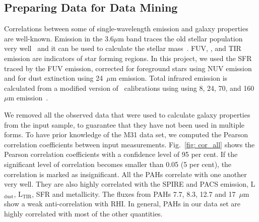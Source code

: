      \subsection{Preparing Data for Data Mining}
    
     Correlations between some of single-wavelength emission and galaxy properties are well-known.
     Emission in the 3.6$\mu$m band traces the old stellar population very well~\citep[e.g.][]{Smith07a,Leitherer99} and it can be used to calculate the stellar mass~\citep{Eskew12}.
     FUV, \halpha, and TIR emission are indicators of star forming regions.
     In this project, we used the SFR traced by the FUV emission, corrected for foreground stars using NUV emission and for dust extinction using 24~$\mu$m emission.
     Total infrared emission is calculated from a modified version of~\cite{Draine07} calibrations using using 8, 24, 70, and 160~$\mu$m emission~\citep{Boquien10}.
    
    
    We removed all the observed data that were used to calculate galaxy properties from the input sample, to guarantee that they have not been used in multiple forms.
    To have prior knowledge of the M31 data set, 
    we computed the Pearson correlation coefficients between input measurements.
    Fig.~\ref{fig: cor_all} shows the Pearson correlation coefficients with a confidence level of 95 per cent. 
    If the significant level of correlation becomes smaller than 0.05 (5 per cent), the correlation is marked as insignificant. 
    All the PAHs correlate with one another very well.
    They are also highly correlated with the SPIRE and PACS emission, L$_\mathrm{dust}$, L$_\mathrm{TIR}$, SFR and metallicity.
    The fluxes from PAHs 7.7, 8.3, 12.7 and 17~$\mu$m show a weak anti-correlation with RHI.
    In general, PAHs in our data set are highly correlated with most of the other quantities. 
    
